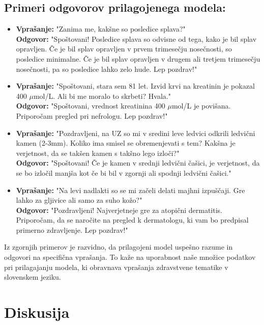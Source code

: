 \documentclass[fleqn,moreauthors,10pt]{ds_report}
\begin{document}
\subsection*{Primeri odgovorov prilagojenega modela:}
\begin{itemize}
    \item 
        \textbf{Vprašanje:} "Zanima me, kakšne so posledice splava?" \\
        \textbf{Odgovor:} "Spoštovani! Posledice splava so odvisne od tega, kako je bil splav opravljen. Če je bil splav opravljen v prvem trimesečju nosečnosti, so posledice minimalne. Če je bil splav opravljen v drugem ali tretjem trimesečju nosečnosti, pa so posledice lahko zelo hude. Lep pozdrav!"
    \item 
        \textbf{Vprašanje:} "Spoštovani, stara sem 81 let. Izvid krvi na kreatinin je pokazal 400 $\mu$mol/L. Ali bi me moralo to skrbeti? Hvala." \\
        \textbf{Odgovor:} "Spoštovani, vrednost kreatinina 400 $\mu$mol/L je povišana. Priporočam pregled pri nefrologu. Lep pozdrav!"
    \item
        \textbf{Vprašanje:} "Pozdravljeni, na UZ so mi v sredini leve ledvici odkrili ledvični kamen (2-3mm). Koliko ima smisel se obremenjevati s tem? Kakšna je verjetnost, da se takšen kamen s takšno lego izloči?" \\
        \textbf{Odgovor:} "Spoštovani! Če je kamen v srednji ledvični čašici, je verjetnost, da se bo izločil manjša kot če bi bil v zgornji ali spodnji ledvični čašici."
    \item
        \textbf{Vprašanje:} "Na levi nadlakti so se mi začeli delati majhni izpuščaji. Gre lahko za gljivice ali samo za suho kožo?" \\
        \textbf{Odgovor:} "Pozdravljeni! Najverjetneje gre za atopični dermatitis. Priporočam, da se naročite na pregled k dermatologu, ki vam bo predpisal primerno zdravljenje. Lep pozdrav!"
\end{itemize}

Iz zgornjih primerov je razvidno, da prilagojeni model uspešno razume in odgovori na specifična vprašanja. To kaže na uporabnost naše množice podatkov pri prilagajanju modela, ki obravnava vprašanja zdravstvene tematike v slovenskem jeziku.


\section*{Diskusija}
\end{document}
